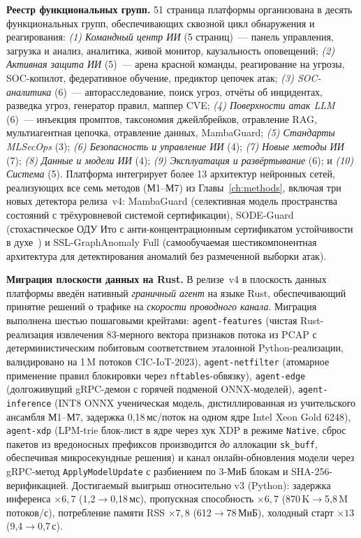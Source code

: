 \noindent\textbf{Реестр функциональных групп.} 51 страница платформы
организована в десять функциональных групп, обеспечивающих сквозной
цикл обнаружения и реагирования: \emph{(1) Командный центр ИИ} (5
страниц)~--- панель управления, загрузка и анализ, аналитика, живой
монитор, каузальность оповещений; \emph{(2) Активная защита ИИ}
(5)~--- арена красной команды, реагирование на угрозы, SOC-копилот,
федеративное обучение, предиктор цепочек атак; \emph{(3) SOC-аналитика}
(6)~--- авторасследование, поиск угроз, отчёты об инцидентах,
разведка угроз, генератор правил, маппер CVE; \emph{(4) Поверхности
атак LLM} (6)~--- инъекция промптов, таксономия джейлбрейков,
отравление RAG, мультиагентная цепочка, отравление данных, MambaGuard;
\emph{(5) Стандарты MLSecOps} (3); \emph{(6) Безопасность и
управление ИИ} (4); \emph{(7) Новые методы ИИ} (7); \emph{(8) Данные
и модели ИИ} (4); \emph{(9) Эксплуатация и развёртывание} (6); и
\emph{(10) Система} (5). Платформа интегрирует более 13 архитектур
нейронных сетей, реализующих все семь методов (М1--М7) из
Главы~\ref{ch:methods}, включая три новых детектора релиза~v4:
\textsf{MambaGuard} (селективная модель пространства состояний
с трёхуровневой системой сертификации), \textsf{SODE-Guard}
(стохастическое ОДУ Ито с анти-концентрационным сертификатом
устойчивости в духе~\cite{Cohen2019}) и \textsf{SSL-GraphAnomaly Full}
(самообучаемая шестикомпонентная архитектура для детектирования
аномалий без размеченной выборки атак).

\noindent\textbf{Миграция плоскости данных на Rust.} В релизе~v4 в
плоскость данных платформы введён нативный \emph{граничный агент}
на языке Rust, обеспечивающий принятие решений о трафике на
\emph{скорости проводного канала}. Миграция выполнена шестью
пошаговыми крейтами: \texttt{agent-features} (чистая Rust-реализация
извлечения 83-мерного вектора признаков потока из PCAP с
детерминистическим побитовым соответствием эталонной Python-реализации,
валидировано на 1\,M потоков CIC-IoT-2023), \texttt{agent-netfilter}
(атомарное применение правил блокировки через \texttt{nftables}-обвязку),
\texttt{agent-edge} (долгоживущий gRPC-демон с горячей подменой
ONNX-моделей), \texttt{agent-inference} (INT8 ONNX ученическая
модель, дистиллированная из учительского ансамбля М1--М7, задержка
0,18\,мс/поток на одном ядре Intel Xeon Gold 6248), \texttt{agent-xdp}
(LPM-trie блок-лист в ядре через хук XDP в режиме \texttt{Native},
сброс пакетов из вредоносных префиксов производится \emph{до}
аллокации \texttt{sk\_buff}, обеспечивая микросекундные решения)
и канал онлайн-обновления модели через gRPC-метод
\texttt{ApplyModelUpdate} с разбиением по 3-МиБ блокам и
SHA-256-верификацией. Достигаемый выигрыш относительно v3
(Python): задержка инференса $\times 6{,}7$ (1,2$\to$0,18\,мс),
пропускная способность $\times 6{,}7$ (870\,K$\to$5,8\,M потоков/с),
потребление памяти RSS $\times 7{,}8$ (612$\to$78\,МиБ), холодный
старт $\times 13$ (9,4$\to$0,7\,с).

